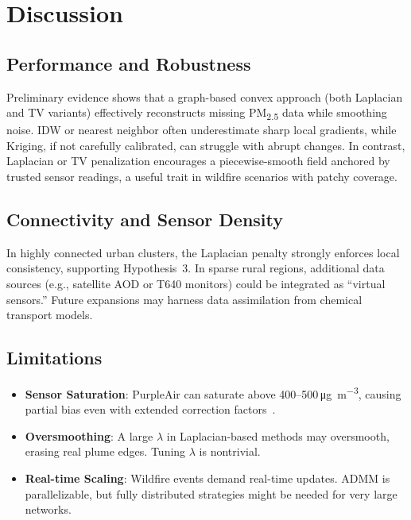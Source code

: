 \documentclass[12pt]{article}                                %
\begin{document}
\section{Discussion}
\label{sec:discussion}    %

\subsection{Performance and Robustness} %
Preliminary evidence shows that a graph-based convex approach (both Laplacian and TV variants) 
effectively reconstructs missing PM\textsubscript{2.5} data while smoothing noise. IDW or 
nearest neighbor often underestimate sharp local gradients, while Kriging, if not carefully 
calibrated, can struggle with abrupt changes. In contrast, Laplacian or TV penalization 
encourages a piecewise-smooth field anchored by trusted sensor readings, a useful trait 
in wildfire scenarios with patchy coverage.

\subsection{Connectivity and Sensor Density}   %
In highly connected urban clusters, the Laplacian penalty strongly enforces local consistency, 
supporting Hypothesis~3. In sparse rural regions, additional data sources (e.g., satellite 
AOD or T640 monitors) could be integrated as “virtual sensors.” Future expansions may harness 
data assimilation from chemical transport models.

\subsection{Limitations}  %
\begin{itemize}
    \item \textbf{Sensor Saturation}: PurpleAir can saturate above 400--500\,\si{\micro\gram\per\cubic\meter}, 
          causing partial bias even with extended correction factors~\cite{Barkjohn2022Sensors}.
    \item \textbf{Oversmoothing}: A large $\lambda$ in Laplacian-based methods may oversmooth, 
          erasing real plume edges. Tuning $\lambda$ is nontrivial.
    \item \textbf{Real-time Scaling}: Wildfire events demand real-time updates. ADMM is 
          parallelizable, but fully distributed strategies might be needed for very large networks.
\end{itemize}
\end{document}
